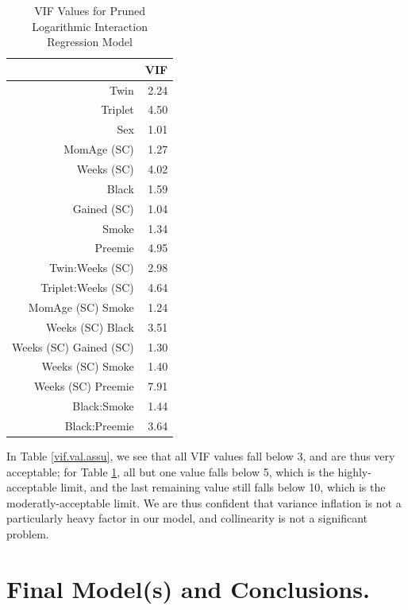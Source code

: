 \documentclass{article}\usepackage[]{graphicx}\usepackage[]{xcolor}
\begin{document}
\begin{table}[H]
\centering
\begin{tabular}{rr}
  \hline
 & VIF \\ 
  \hline
Twin & 2.24 \\ 
  Triplet & 4.50 \\ 
  Sex & 1.01 \\ 
  MomAge (SC) & 1.27 \\ 
  Weeks (SC) & 4.02 \\ 
  Black & 1.59 \\ 
  Gained (SC) & 1.04 \\ 
  Smoke & 1.34 \\ 
  Preemie & 4.95 \\ 
  Twin:Weeks (SC) & 2.98 \\ 
  Triplet:Weeks (SC) & 4.64 \\ 
  MomAge (SC) Smoke & 1.24 \\ 
  Weeks (SC) Black & 3.51 \\ 
  Weeks (SC) Gained (SC) & 1.30 \\ 
  Weeks (SC) Smoke & 1.40 \\ 
  Weeks (SC) Preemie & 7.91 \\ 
  Black:Smoke & 1.44 \\ 
  Black:Preemie & 3.64 \\ 
   \hline
\end{tabular}
\caption{VIF Values for Pruned Logarithmic Interaction Regression Model} 
\label{vif.val.accur}
\end{table}

In Table \ref{vif.val.assu}, we see that all VIF values fall below 3, and are thus very acceptable; for Table \ref{vif.val.accur}, all but one value falls below 5, which is the highly-acceptable limit, and the last remaining value still falls below 10, which is the moderatly-acceptable limit. We are thus confident that variance inflation is not a particularly heavy factor in our model, and collinearity is not a significant problem.

\section{Final Model(s) and Conclusions.}
\end{document}
